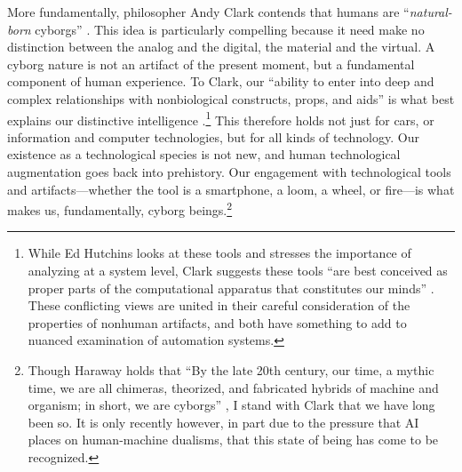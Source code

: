 More fundamentally, philosopher Andy
Clark contends that humans are ``\emph{natural-born}
cyborgs'' \cite[p. 6]{clarkNBC}. This idea is particularly compelling
because it need make no distinction between the analog and the
digital, the material and the virtual. A cyborg nature is not an artifact of the
present moment, but a fundamental component of human experience. To
Clark, our ``ability to enter into deep and complex relationships with
nonbiological constructs, props, and aids'' is what best explains our
distinctive intelligence \cite[p. 5]{clarkNBC}.\footnote{While Ed
  Hutchins looks at these tools and stresses the importance of
  analyzing at a system level, Clark suggests these tools ``are best
  conceived as proper parts of the computational apparatus that
  constitutes our minds'' \cite[p. 6]{clarkNBC}. These conflicting views are
  united in their careful consideration of the properties of nonhuman artifacts,
  and both have something to add to nuanced examination of automation
  systems.} This therefore holds 
not just for cars, or information and computer technologies, but for
all kinds of technology. Our existence as a technological species is
not new, and human technological augmentation goes back into
prehistory. Our engagement with technological tools and
artifacts---whether the tool is a smartphone, a loom, a wheel, or
fire---is what makes us, fundamentally, cyborg beings.\footnote{Though Haraway holds that ``By the late 20th
century, our time, a mythic time, we are all chimeras,
theorized, and fabricated hybrids of machine and organism; in short,
we are cyborgs'' \cite[p. 118]{haraway}, I stand with Clark that we
have long been so. It is only recently however, in part due to the pressure
that AI places on human-machine dualisms, that this state of being has
come to be recognized.}

